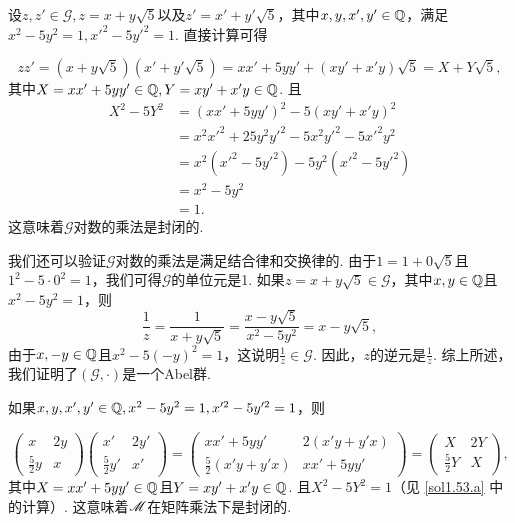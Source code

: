 \begin{solution}
  \begin{enuma}
    \item\label{sol1.53.a} 设$z,z'\in\mathscr G,z=x+y\sqrt5$以及$z'=x'+y'\sqrt5$，其中$x,y,x',y'\in\mathbb Q$，满足$x^2-5y^2=1,x'^2-5y'^2=1$. 直接计算可得
  \end{enuma}
     \[
       zz' = (x+y\sqrt5)(x'+y'\sqrt5) = xx' + 5yy' + (xy'+x'y)\sqrt5 = X + Y\sqrt5,
     \]
  其中$X=xx'+5yy'\in\mathbb Q,Y=xy'+x'y\in\mathbb Q$. 且
     \begin{align*}
       X^2 - 5Y^2 & = (xx'+5yy')^2 - 5(xy'+x'y)^2 \\
       & = x^2x'^2 + 25y^2y'^2 - 5x^2y'^2 - 5x'^2y^2 \\
       & = x^2(x'^2-5y'^2) - 5y^2(x'^2-5y'^2) \\
       & = x^2 - 5y^2 \\
       & = 1.
     \end{align*}
  这意味着$\mathscr G$对数的乘法是封闭的.

  我们还可以验证$\mathscr G$对数的乘法是满足结合律和交换律的. 由于$1=1+0\sqrt5$且$1^2-5\cdot0^2=1$，我们可得$\mathscr G$的单位元是1. 如果$z=x+y\sqrt5\in\mathscr G$，其中$x,y\in\mathbb Q$且$x^2-5y^2=1$，则
  \[
    \frac1z = \frac1{x+y\sqrt5} = \frac{x-y\sqrt5}{x^2-5y^2} = x - y\sqrt5,
  \]
  由于$x,-y\in\mathbb Q$且$x^2-5(-y)^2=1$，这说明$\frac1z\in\mathscr G$. 因此，$z$的逆元是$\frac1z$. 综上所述，我们证明了$(\mathscr G,\cdot)$是一个Abel群.

  \begin{enuma}\setcounter{enumi}{1}
    \item 如果$x,y,x',y'\in\mathbb Q,x^2-5y^2=1,x'^2-5y'^2=1$，则
  \end{enuma}
  \[
    \begin{pmatrix}
      x & 2y \\
      \frac52y & x
    \end{pmatrix}
    \begin{pmatrix}
      x' & 2y' \\
      \frac52y' & x'
    \end{pmatrix} =
    \begin{pmatrix}
      xx' + 5yy' & 2(x'y+y'x) \\
      \frac52(x'y+y'x) & xx' + 5yy'
    \end{pmatrix} =
    \begin{pmatrix}
      X & 2Y \\
      \frac52Y & X
    \end{pmatrix},
  \]
  其中$X=xx'+5yy'\in\mathbb Q$且$Y=xy'+x'y\in\mathbb Q$. 且$X^2-5Y^2=1$（见 \ref{sol1.53.a} 中的计算）. 这意味着$\mathscr M$在矩阵乘法下是封闭的.


\end{solution}
